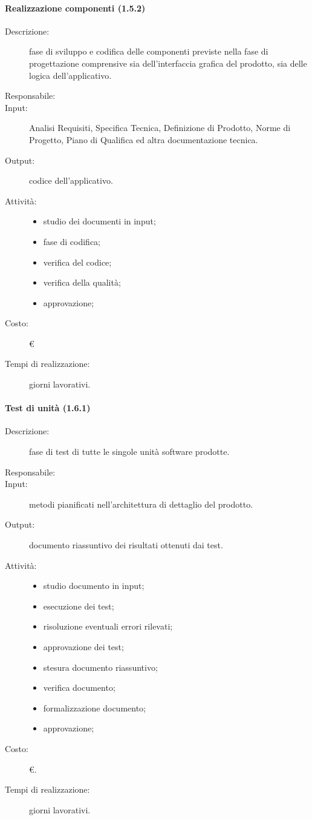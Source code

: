 \paragraph{Realizzazione componenti (1.5.2)}
\begin{description}
\item[Descrizione:] fase di sviluppo e codifica delle componenti previste nella fase di progettazione comprensive sia dell'interfaccia grafica del prodotto, sia delle logica dell'applicativo.
\item[Responsabile:] 
\item[Input:] Analisi Requisiti, Specifica Tecnica, Definizione di Prodotto, Norme di Progetto, Piano di Qualifica ed altra documentazione tecnica.
\item[Output:] codice dell'applicativo.
\item[Attività:]
\begin{itemize}
\item studio dei documenti in input;
\item fase di codifica;
\item verifica del codice;
\item verifica della qualità;
\item approvazione;
\end{itemize}
\item[Costo:] \euro{}
\item[Tempi di realizzazione:]  giorni lavorativi.
\end{description}

\paragraph{Test di unità (1.6.1)}
\begin{description}
\item[Descrizione:] fase di test di tutte le singole unità software prodotte.
\item[Responsabile:] 
\item[Input:] metodi pianificati nell'architettura di dettaglio del prodotto.
\item[Output:] documento riassuntivo dei risultati ottenuti dai test.
\item[Attività:]
\begin{itemize}
\item studio documento in input;
\item esecuzione dei test;
\item risoluzione eventuali errori rilevati;
\item approvazione dei test;
\item stesura documento riassuntivo;
\item verifica documento;
\item formalizzazione documento;
\item approvazione;
\end{itemize}
\item[Costo:] \euro{}.
\item[Tempi di realizzazione:]  giorni lavorativi.
\end{description}

